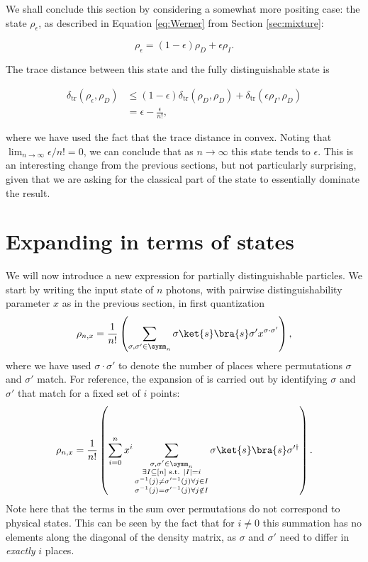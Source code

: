 We shall conclude this section by considering a somewhat more positing case: the state $\rho_\epsilon$, as described in Equation \ref{eq:Werner} from Section \ref{sec:mixture}:

\begin{equation}
\rho_\epsilon = (1-\epsilon)\rho_D + \epsilon\rho_I.
\end{equation}

The trace distance between this state and the fully distinguishable state is

\begin{align}
\delta_{\textrm{tr}}(\rho_\epsilon,\rho_D) &\leq (1-\epsilon)\delta_{\textrm{tr}}(\rho_D,\rho_D) + \delta_{\textrm{tr}}(\epsilon\rho_I,\rho_D)\\
&= \epsilon-\frac{\epsilon}{n!},
\end{align}

\noindent where we have used the fact that the trace distance in convex. Noting that $\lim_{n\rightarrow\infty}\epsilon/n! = 0$, we can conclude that as $n\rightarrow\infty$ this state tends to $\epsilon$. This is an interesting change from the previous sections, but not particularly surprising, given that we are asking for the classical part of the state to essentially dominate the result.

\section{Expanding in terms of states}
\label{sec:expansion}

We will now introduce a new expression for partially distinguishable particles. We start by writing the input state of $n$ photons, with pairwise distinguishability parameter $x$ as in the previous section, in first quantization
\begin{equation}
\label{eqn:rhon}
\rho_{n,x} = \frac{1}{n!}\left(\sum_{\sigma,\sigma'\in\symm_n}\sigma\ket{s}\bra{s}\sigma'x^{\sigma\cdot\sigma'}\right),
\end{equation}
where we have used $\sigma\cdot\sigma'$ to denote the number of places where permutations $\sigma$ and $\sigma'$ match.
For reference, the expansion of \cite{renema2018,renema2018loss} is carried out by identifying $\sigma$ and $\sigma'$ that match for a fixed set of $i$ points:
\begin{equation}
\label{eqn:rhoni}
\rho_{n,x} = \frac{1}{n!}\left(\sum_{i=0}^nx^i\sum_{\substack{\sigma,\sigma'\in\symm_n\\\exists I\subseteq [n] \textrm{ s.t. } |I|=i\\\sigma^{-1}(j)\neq\sigma'^{-1}(j)\forall j \in I\\\sigma^{-1}(j)=\sigma'^{-1}(j)\forall j \notin I}}\sigma\ket{s}\bra{s}\sigma'^\dagger\right).
\end{equation}
Note here that the terms in the sum over permutations do not correspond to physical states. 
This can be seen by the fact that for $i\neq 0$ this summation has no elements along the diagonal of the density matrix, as $\sigma$ and $\sigma'$ need to differ in \emph{exactly} $i$ places.

